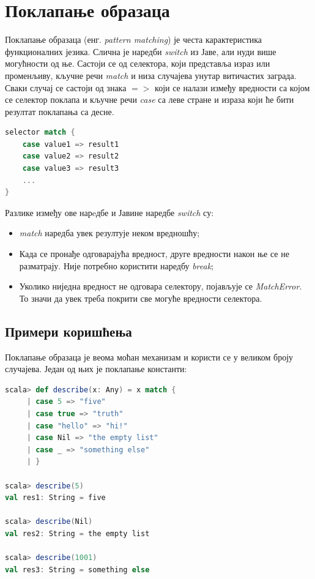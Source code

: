 \documentclass[12pt,oneside]{memoir}
\begin{document}
\section{Поклапање образаца}
\label{sec:scala_patt_match}

Поклапање образаца (енг. \textit{pattern matching}) је честа карактеристика функционалних језика. Слична је наредби \textit{switch} из Јаве, али нуди више могућности од ње. Састоји се од селектора, који представља израз или променљиву, кључне речи \textit{match} и низа случајева унутар витичастих заграда. Сваки случај се састоји од знака $=>$ који се налази између вредности са којом се селектор поклапа и кључне речи \textit{case} са леве стране и израза који ће бити резултат поклапања са десне. \cite{scala_prog}

\begin{lstlisting}[language=Scala, caption={Поклапање образаца у Скали}, label={lst:scala_coll_patt_match}]
selector match {
	case value1 => result1
	case value2 => result2
	case value3 => result3
	...
}
\end{lstlisting}

Разлике између ове нарeдбе и Јавине наредбе \textit{switch} су:

\begin{itemize} 
\item \textit{match} наредба увек резултује неком вредношћу;
\item Када се пронађе одговарајућа вредност, друге вредности након ње се не разматрају. Није потребно користити наредбу \textit{break};
\item Уколико ниједна вредност не одговара селектору, појављује се \textit{MatchError}. То значи да увек треба покрити све могуће вредности селектора.
\end{itemize}

\subsection{Примери коришћења}
\label{subsec:scala_match_exaples}

Поклапање образаца је веома моћан механизам и користи се у великом броју случајева. Један од њих је поклапање константи:

\begin{lstlisting}[language=Scala, caption={Поклапање константи}, label={lst:scala_patt_match_match_const_example}]
scala> def describe(x: Any) = x match {
     | case 5 => "five"
     | case true => "truth"
     | case "hello" => "hi!"
     | case Nil => "the empty list"
     | case _ => "something else"
     | }
     
scala> describe(5)
val res1: String = five

scala> describe(Nil)
val res2: String = the empty list

scala> describe(1001)
val res3: String = something else
\end{lstlisting}
\end{document}
